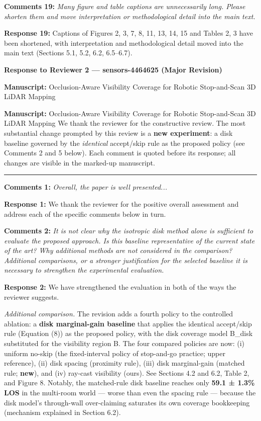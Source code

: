 \documentclass[11pt]{article}
\begin{document}
\medskip

\textbf{Comments 19:} \emph{Many figure and table captions are unnecessarily long. Please shorten them and move interpretation or methodological detail into the main text.}

\textbf{Response 19:} Captions of Figures 2, 3, 7, 8, 11, 13, 14, 15 and Tables 2, 3 have been shortened, with interpretation and methodological detail moved into the main text (Sections 5.1, 5.2, 6.2, 6.5–6.7).

\medskip

\clearpage
\begin{center}\LARGE\bfseries Response to Reviewer 2 — sensors-4464625 (Major Revision)\end{center}

\textbf{Manuscript:} Occlusion-Aware Visibility Coverage for Robotic Stop-and-Scan 3D LiDAR Mapping

\textbf{Manuscript:} Occlusion-Aware Visibility Coverage for Robotic Stop-and-Scan 3D LiDAR Mapping
We thank the reviewer for the constructive review. The most substantial change prompted by this review is a \textbf{new experiment}: a disk baseline governed by the \emph{identical} accept/skip rule as the proposed policy (see Comments 2 and 5 below). Each comment is quoted before its response; all changes are visible in the marked-up manuscript.

\medskip\hrule\medskip

\textbf{Comments 1:} \emph{\emph{Overall, the paper is well presented...}}

\textbf{Response 1:} We thank the reviewer for the positive overall assessment and address each of the specific comments below in turn.

\medskip

\textbf{Comments 2:} \emph{\emph{It is not clear why the isotropic disk method alone is sufficient to evaluate the proposed approach. Is this baseline representative of the current state of the art? Why additional methods are not considered in the comparison? Additional comparisons, or a stronger justification for the selected baseline it is necessary to strengthen the experimental evaluation.}}

\textbf{Response 2:} We have strengthened the evaluation in both of the ways the reviewer suggests.

\emph{Additional comparison.} The revision adds a fourth policy to the controlled ablation: a \textbf{disk marginal-gain baseline} that applies the identical accept/skip rule (Equation (8)) as the proposed policy, with the disk coverage model B\_disk substituted for the visibility region B. The four compared policies are now: (i) uniform no-skip (the fixed-interval policy of stop-and-go practice; upper reference), (ii) disk spacing (proximity rule), (iii) disk marginal-gain (matched rule; \textbf{new}), and (iv) ray-cast visibility (ours). See Sections 4.2 and 6.2, Table 2, and Figure 8. Notably, the matched-rule disk baseline reaches only \textbf{59.1 ± 1.3\% LOS} in the multi-room world — worse than even the spacing rule — because the disk model's through-wall over-claiming saturates its own coverage bookkeeping (mechanism explained in Section 6.2).
\end{document}
